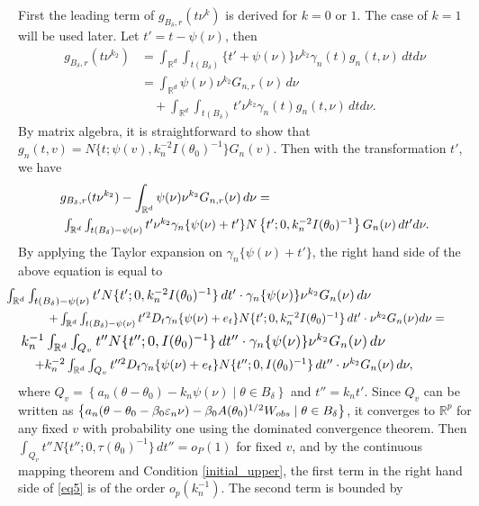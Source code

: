 	First the leading term of $g_{B_{\delta},r}(t\nu^{k})$ is derived
	for $k=0$ or $1$. The case of $k=1$ will be used later. Let $t'=t-\psi(\nu)$,
	then 
	\begin{align*}
	g_{B_{\delta},r}(t\nu^{k_{2}}) & =\int_{\mathbb{R}^{d}}\int_{t(B_{\delta})}\{t'+\psi(\nu)\}\nu^{k_{2}}\gamma_{n}(t)g_{n}(t,\nu)\,dtd\nu\\
	& =\int_{\mathbb{R}^{d}}\psi(\nu)\nu^{k_{2}}G_{n,r}(\nu)\,d\nu \nonumber \\
	&\quad+\int_{\mathbb{R}^{d}}\int_{t(B_{\delta})}t'\nu^{k_{2}}\gamma_{n}(t)g_{n}(t,\nu)\,dtd\nu.
	\end{align*}
	By matrix algebra, it is straightforward to show that $g_{n}(t,v)=N\{t;\psi(v),k_{n}^{-2}I(\theta_{0})^{-1}\}G_{n}(v)$.
	Then with the transformation $t'$, we have
	\begin{align*}
	& g_{B_{\delta},r}(t\nu^{k_{2}})-\int_{\mathbb{R}^{d}}\psi(\nu)\nu^{k_{2}}G_{n,r}(\nu)\,d\nu = \\
	&\resizebox{0.85\hsize}{!}{
	 $\int_{\mathbb{R}^{d}}\int_{t(B_{\delta})-\psi(\nu)}t'\nu^{k_{2}}\gamma_{n}\{\psi(\nu)+t'\}N\left\{ t';0,k_{n}^{-2}I(\theta_{0})^{-1}\right\} G_{n}(\nu)\,dt'd\nu.$}
	\end{align*}
	By applying the Taylor expansion on $\gamma_{n}\{\psi(\nu)+t'\}$,
	the right hand side of the above equation is equal to 
	\begin{eqnarray}
	&\hspace{-12mm}\resizebox{0.85\hsize}{!}{
	$\int_{\mathbb{R}^{d}}\int_{t(B_{\delta})-\psi(\nu)}t'N\{t';0,k_{n}^{-2}I(\theta_{0})^{-1}\}\,dt'\cdot\gamma_{n}\{\psi(\nu)\}\nu^{k_{2}}G_{n}(\nu)\,d\nu$}\nonumber \\
	&\resizebox{0.92\hsize}{!}{
	$+\int_{\mathbb{R}^{d}}\int_{t(B_{\delta})-\psi(\nu)}t'{}^{2}D_{t}\gamma_{n}\{\psi(\nu)+e_{t}\}N\{t';0,k_{n}^{-2}I(\theta_{0})^{-1}\}\,dt'\cdot\nu^{k_{2}}G_{n}(\nu)d\nu = $} \nonumber \\
	&\hspace{-8mm}\resizebox{0.85\hsize}{!}{
	$k_{n}^{-1}\int_{\mathbb{R}^{d}}\int_{Q_{v}}t''N\{t'';0,I(\theta_{0})^{-1}\}\,dt''\cdot\gamma_{n}\{\psi(\nu)\}\nu^{k_{2}}G_{n}(\nu)\,d\nu$}\label{eq5} \\
	&\hspace{-4mm}\resizebox{0.88\hsize}{!}{
	$+k_{n}^{-2}\int_{\mathbb{R}^{d}}\int_{Q_{v}}t''^{2}D_{t}\gamma_{n}\{\psi(\nu)+e_{t}\}N\{t'';0,I(\theta_{0})^{-1}\}\,dt''\cdot\nu^{k_{2}}G_{n}(\nu)\,d\nu,$}\nonumber
	\end{eqnarray}
	where $Q_{v}=\left\{ a_{n}(\theta-\theta_{0})-k_{n}\psi(\nu)\mid\theta\in B_{\delta}\right\} $
	and $t''=k_{n}t'$. 
	Since $Q_{v}$ can be written as $\left\{ a_{n}(\theta-\theta_{0}-\beta_{0}\varepsilon_{n}\nu)-\beta_{0}A(\theta_{0})^{1/2}W_{\relax obs}\mid\theta\in B_{\delta}\right\} $,
	it converges to $\mathbb{R}^{p}$ for any fixed $v$ with probability one using the dominated convergence theorem. 
	Then $\int_{Q_{v}}t''N\{t'';0,\tau(\theta_{0})^{-1}\}\,dt''=o_{P}(1)$
	for fixed $v$, and by the continuous mapping theorem and Condition \ref{initial_upper}, the
	first term in the right hand side of \eqref{eq5} is of the order
	$o_{p}(k_{n}^{-1})$. The second term is bounded by 
	
